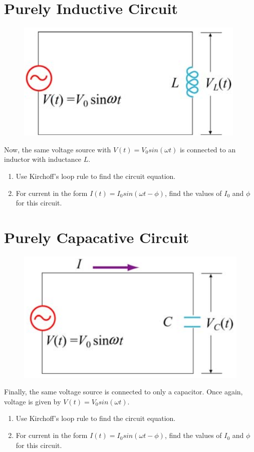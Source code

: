 \documentclass[a4paper]{article}
\begin{document}
\section{Purely Inductive Circuit}
    \begin{figure}[h]
        \centering
        \includegraphics[scale=.5]{inductorcircuit.png}
        \label{fig:inductorcircuit}
    \end{figure}
    
Now, the same voltage source with $V(t) = V_0 sin(\omega t)$ is connected to an inductor with inductance $L$. 
\begin{enumerate}[label=(\alph*), itemsep=5mm,after=\vspace{5mm}]
    \item Use Kirchoff's loop rule to find the circuit equation.
    \item For current in the form $I(t) = I_0 sin(\omega t - \phi)$, find the values of $I_0$ and $\phi$ for this circuit.
\end{enumerate}

\section{Purely Capacative Circuit}
    \begin{figure}[h]
        \centering
        \includegraphics[scale=.5]{capacitorcircuit.png}
        \label{fig:capacitorcircuit}
    \end{figure}
    Finally, the same voltage source is connected to only a capacitor. Once again, voltage is given by $V(t) = V_0 sin(\omega t)$.
    \begin{enumerate}[label=(\alph*), itemsep=5mm,after=\vspace{5mm}]
    \item Use Kirchoff's loop rule to find the circuit equation.
    \item For current in the form $I(t) = I_0 sin(\omega t - \phi)$, find the values of $I_0$ and $\phi$ for this circuit.
\end{enumerate}
\end{document}
